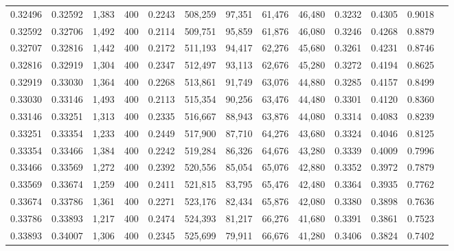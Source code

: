 \begin{tabular}{rrrrrrrrrrrrr}
0.32496 & 0.32592 &  1,383 & 400 &                                     0.2243 & 508,259 &  97,351 &  61,476 &  46,480 & 0.3232 & 0.4305 & 0.9018 \\
0.32592 & 0.32706 &  1,492 & 400 &                                     0.2114 & 509,751 &  95,859 &  61,876 &  46,080 & 0.3246 & 0.4268 & 0.8879 \\
0.32707 & 0.32816 &  1,442 & 400 &                                     0.2172 & 511,193 &  94,417 &  62,276 &  45,680 & 0.3261 & 0.4231 & 0.8746 \\
0.32816 & 0.32919 &  1,304 & 400 &                                     0.2347 & 512,497 &  93,113 &  62,676 &  45,280 & 0.3272 & 0.4194 & 0.8625 \\
0.32919 & 0.33030 &  1,364 & 400 &                                     0.2268 & 513,861 &  91,749 &  63,076 &  44,880 & 0.3285 & 0.4157 & 0.8499 \\
0.33030 & 0.33146 &  1,493 & 400 &                                     0.2113 & 515,354 &  90,256 &  63,476 &  44,480 & 0.3301 & 0.4120 & 0.8360 \\
0.33146 & 0.33251 &  1,313 & 400 &                                     0.2335 & 516,667 &  88,943 &  63,876 &  44,080 & 0.3314 & 0.4083 & 0.8239 \\
0.33251 & 0.33354 &  1,233 & 400 &                                     0.2449 & 517,900 &  87,710 &  64,276 &  43,680 & 0.3324 & 0.4046 & 0.8125 \\
0.33354 & 0.33466 &  1,384 & 400 &                                     0.2242 & 519,284 &  86,326 &  64,676 &  43,280 & 0.3339 & 0.4009 & 0.7996 \\
0.33466 & 0.33569 &  1,272 & 400 &                                     0.2392 & 520,556 &  85,054 &  65,076 &  42,880 & 0.3352 & 0.3972 & 0.7879 \\
0.33569 & 0.33674 &  1,259 & 400 &                                     0.2411 & 521,815 &  83,795 &  65,476 &  42,480 & 0.3364 & 0.3935 & 0.7762 \\
0.33674 & 0.33786 &  1,361 & 400 &                                     0.2271 & 523,176 &  82,434 &  65,876 &  42,080 & 0.3380 & 0.3898 & 0.7636 \\
0.33786 & 0.33893 &  1,217 & 400 &                                     0.2474 & 524,393 &  81,217 &  66,276 &  41,680 & 0.3391 & 0.3861 & 0.7523 \\
0.33893 & 0.34007 &  1,306 & 400 &                                     0.2345 & 525,699 &  79,911 &  66,676 &  41,280 & 0.3406 & 0.3824 & 0.7402 \\

\end{tabular}
